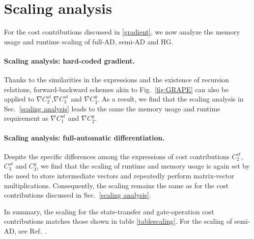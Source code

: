 \section{Scaling analysis}
\label{scaling analysis for other cost contributions}
For the cost contributions discussed in \ref{gradient},
we now analyze the memory usage and runtime scaling of full-AD, semi-AD and HG.
\paragraph{Scaling analysis: hard-coded gradient.}
Thanks to the similarities in the expressions and the existence of recursion relations, forward-backward schemes akin to Fig.\ \ref{fig:GRAPE} 
can also be applied to $\nabla C_2^{st}$,$\nabla C_3^{st}$ and $\nabla C_3^{g}$. As a result, we find that the scaling analysis in Sec.\ \ref{scaling analysis} leads to the same the memory usage and runtime requirement as $\nabla C_1^{st}$ and $\nabla C_2^{g}$.



\paragraph{Scaling analysis: full-automatic differentiation.}
Despite the specific differences among the expressions of cost contributions $C_2^{st}$, $C_3^{st}$ and $C_3^{g}$, we find that the scaling of runtime and memory usage is again set by the need to store intermediate vectors and repeatedly perform matrix-vector multiplications. Consequently, the scaling remains the same as for the cost contributions discussed in Sec.\ \ref{scaling analysis}.

In summary, the scaling for the state-transfer and gate-operation cost contributions matches those shown in table \ref{tablescaling}. For the scaling of semi-AD, see Ref.\ \cite{semiadgoerz2022quantum}.

